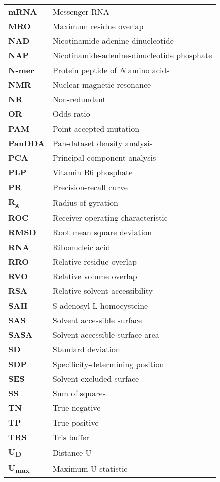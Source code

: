 \begin{longtable}[l]{@{}p{2.5cm}p{12cm}@{}}
\textbf{mRNA} & Messenger RNA \\
\textbf{MRO} & Maximum residue overlap \\
\textbf{NAD} & Nicotinamide-adenine-dinucleotide \\
\textbf{NAP} & Nicotinamide-adenine-dinucleotide phosphate \\
\textbf{N-mer} & Protein peptide of \textit{N} amino acids \\
\textbf{NMR} & Nuclear magnetic resonance \\
\textbf{NR} & Non-redundant \\
\textbf{OR} & Odds ratio \\
\textbf{PAM} & Point accepted mutation \\
\textbf{PanDDA} & Pan-dataset density analysis \\
\textbf{PCA} & Principal component analysis \\
\textbf{PLP} & Vitamin B6 phosphate \\
\textbf{PR} & Precision-recall curve \\
\textbf{R\textsubscript{g}} & Radius of gyration \\
\textbf{ROC} & Receiver operating characteristic \\
\textbf{RMSD} & Root mean square deviation \\
\textbf{RNA} & Ribonucleic acid \\
\textbf{RRO} & Relative residue overlap \\
\textbf{RVO} & Relative volume overlap \\
\textbf{RSA} & Relative solvent accessibility \\
\textbf{SAH} & S-adenosyl-L-homocysteine \\
\textbf{SAS} & Solvent accessible surface \\
\textbf{SASA} & Solvent-accessible surface area \\
\textbf{SD} & Standard deviation \\
\textbf{SDP} & Specificity-determining position \\
\textbf{SES} & Solvent-excluded surface \\
\textbf{SS} & Sum of squares \\
\textbf{TN} & True negative \\
\textbf{TP} & True positive \\
\textbf{TRS} & Tris buffer \\
\textbf{U\textsubscript{D}} & Distance U \\
\textbf{U\textsubscript{max}} & Maximum U statistic \\

\end{longtable}
